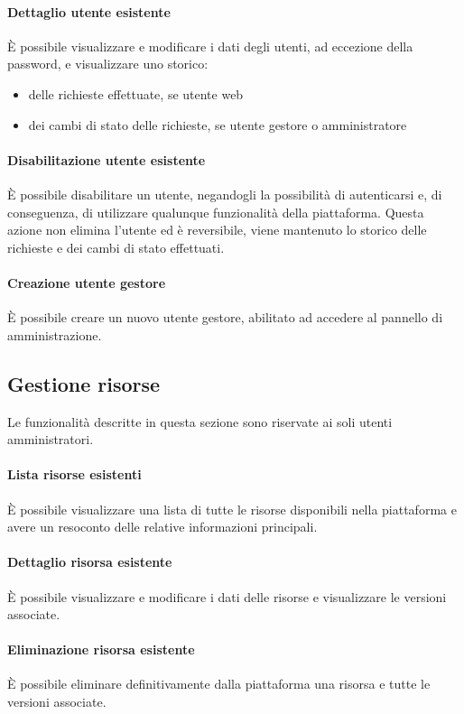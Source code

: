 \paragraph{Dettaglio utente esistente}
È possibile visualizzare e modificare i dati degli utenti, ad eccezione della
password, e visualizzare uno storico:
\begin{itemize}
	\item delle richieste effettuate, se utente web
	\item dei cambi di stato delle richieste, se utente gestore o amministratore
\end{itemize}

\paragraph{Disabilitazione utente esistente}
È possibile disabilitare un utente, negandogli la possibilità di autenticarsi e,
di conseguenza, di utilizzare qualunque funzionalità della piattaforma.
Questa azione non elimina l'utente ed è reversibile, viene mantenuto lo storico
delle richieste e dei cambi di stato effettuati.

\paragraph{Creazione utente gestore}
È possibile creare un nuovo utente gestore, abilitato ad accedere al pannello
di amministrazione.


\subsection{Gestione risorse}
Le funzionalità descritte in questa sezione sono riservate ai soli utenti
amministratori.

\paragraph{Lista risorse esistenti}
È possibile visualizzare una lista di tutte le risorse disponibili nella
piattaforma e avere un resoconto delle relative informazioni principali.

\paragraph{Dettaglio risorsa esistente}
È possibile visualizzare e modificare i dati delle risorse e visualizzare le
versioni associate.

\paragraph{Eliminazione risorsa esistente}
È possibile eliminare definitivamente dalla piattaforma una risorsa e tutte le
versioni associate.

